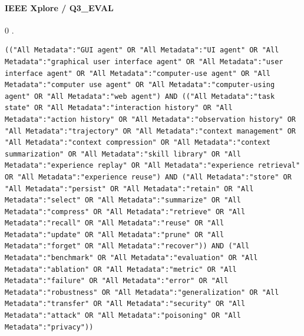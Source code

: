 \noindent\begin{minipage}{\linewidth}
\paragraph{IEEE Xplore / Q3\_EVAL}
0 .
\begin{lstlisting}
(("All Metadata":"GUI agent" OR "All Metadata":"UI agent" OR "All Metadata":"graphical user interface agent" OR "All Metadata":"user interface agent" OR "All Metadata":"computer-use agent" OR "All Metadata":"computer use agent" OR "All Metadata":"computer-using agent" OR "All Metadata":"web agent") AND (("All Metadata":"task state" OR "All Metadata":"interaction history" OR "All Metadata":"action history" OR "All Metadata":"observation history" OR "All Metadata":"trajectory" OR "All Metadata":"context management" OR "All Metadata":"context compression" OR "All Metadata":"context summarization" OR "All Metadata":"skill library" OR "All Metadata":"experience replay" OR "All Metadata":"experience retrieval" OR "All Metadata":"experience reuse") AND ("All Metadata":"store" OR "All Metadata":"persist" OR "All Metadata":"retain" OR "All Metadata":"select" OR "All Metadata":"summarize" OR "All Metadata":"compress" OR "All Metadata":"retrieve" OR "All Metadata":"recall" OR "All Metadata":"reuse" OR "All Metadata":"update" OR "All Metadata":"prune" OR "All Metadata":"forget" OR "All Metadata":"recover")) AND ("All Metadata":"benchmark" OR "All Metadata":"evaluation" OR "All Metadata":"ablation" OR "All Metadata":"metric" OR "All Metadata":"failure" OR "All Metadata":"error" OR "All Metadata":"robustness" OR "All Metadata":"generalization" OR "All Metadata":"transfer" OR "All Metadata":"security" OR "All Metadata":"attack" OR "All Metadata":"poisoning" OR "All Metadata":"privacy"))
\end{lstlisting}
\end{minipage}\par\medskip
